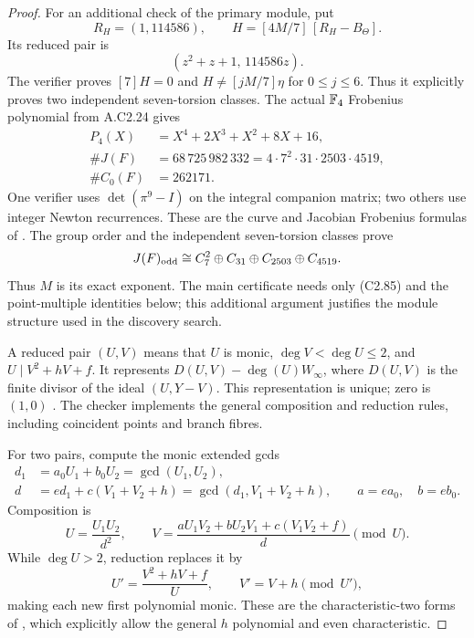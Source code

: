 \begin{proof}
For an additional check of the primary module,
put
\[
 R_H=(1,114586),\qquad H=[4M/7]\,[R_H-B_\Theta].
\]
Its reduced pair is
\[
                   (z^2+z+1,\,114586z).
\]
The verifier proves $[7]H=0$ and
$H\ne[jM/7]\eta$ for $0\le j\le6$.
Thus it explicitly proves two independent
seven-torsion classes.
The actual $\mathbb F_4$ Frobenius polynomial from
A.C2.24 gives
\[
 \begin{aligned}
 P_4(X)&=X^4+2X^3+X^2+8X+16,\\
 \#J(F)&=68\,725\,982\,332
      =4\cdot7^2\cdot31\cdot2503\cdot4519,\\
 \#C_0(F)&=262171.
 \end{aligned}                                             \tag{C2.86}
\]
One verifier uses $\det(\pi^9-I)$ on the
integral companion matrix; two others use
integer Newton recurrences. These are the
curve and Jacobian Frobenius formulas of
\citet[II, Theorem 1.1; III, Theorem 11.1
and Corollary 11.4]{A_Milne2008}.
The group order and the independent
seven-torsion classes prove
\[
 J(F)_{\rm odd}\cong
 C_7^2\oplus C_{31}\oplus C_{2503}\oplus C_{4519}.
\]
Thus $M$ is its exact exponent. The main
certificate needs only (C2.85) and the
point-multiple identities below; this
additional argument justifies the module
structure used in the discovery search.

A reduced pair $(U,V)$ means that $U$ is monic,
$\deg V<\deg U\le2$, and $U\mid V^2+hV+f$.
It represents $D(U,V)-\deg(U)W_\infty$,
where $D(U,V)$ is the finite divisor of the
ideal $(U,Y-V)$. This representation is
unique; zero is $(1,0)$
\citep[Theorem 2.2, author p.~5]{A_Lange2005}.
The checker implements the general
composition and reduction rules, including
coincident points and branch fibres.

For two pairs, compute the monic extended gcds
\[
 \begin{aligned}
 d_1&=a_0U_1+b_0U_2=\gcd(U_1,U_2),\\
 d&=e d_1+c(V_1+V_2+h)
       =\gcd(d_1,V_1+V_2+h),\qquad a=ea_0,\quad b=eb_0.
 \end{aligned}
\]
Composition is
\[
 U=\frac{U_1U_2}{d^2},\qquad
 V=\frac{aU_1V_2+bU_2V_1+c(V_1V_2+f)}d\pmod U.             \tag{C2.87}
\]
While $\deg U>2$, reduction replaces it by
\[
 U'=\frac{V^2+hV+f}U,
 \qquad V'=V+h\pmod {U'},                                  \tag{C2.88}
\]
making each new first polynomial monic.
These are the characteristic-two forms of
\citet[Algorithms 3.1--3.2, author pp.~5--6]
{A_Lange2005}, which explicitly allow the
general $h$ polynomial and even characteristic.


\end{proof}
